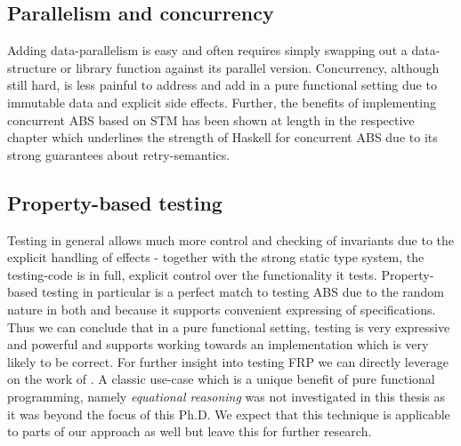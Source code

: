 \subsection{Parallelism and concurrency}
Adding data-parallelism is easy and often requires simply swapping out a data-structure or library function against its parallel version. Concurrency, although still hard, is less painful to address and add in a pure functional setting due to immutable data and explicit side effects. Further, the benefits of implementing concurrent ABS based on STM has been shown at length in the respective chapter which underlines the strength of Haskell for concurrent ABS due to its strong guarantees about retry-semantics. 

\subsection{Property-based testing}
Testing in general allows much more control and checking of invariants due to the explicit handling of effects - together with the strong static type system, the testing-code is in full, explicit control over the functionality it tests. Property-based testing in particular is a perfect match to testing ABS due to the random nature in both and because it supports convenient expressing of specifications. Thus we can conclude that in a pure functional setting, testing is very expressive and powerful and supports working towards an implementation which is very likely to be correct. For further insight into testing FRP we can directly leverage on the work of \cite{perez_testing_2017}. A classic use-case which is a unique benefit of pure functional programming, namely \textit{equational reasoning} was not investigated in this thesis as it was beyond the focus of this Ph.D. We expect that this technique is applicable to parts of our approach as well but leave this for further research.

